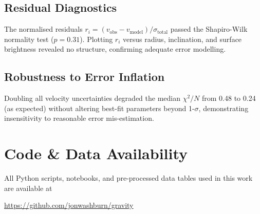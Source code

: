 \documentclass[twocolumn,prd,amsmath,amssymb,aps,superscriptaddress,nofootinbib]{revtex4-2}
\begin{document}
\subsection{Residual Diagnostics}

The normalised residuals $r_i = (v_{\text{obs}} - v_{\text{model}})/\sigma_{\text{total}}$ passed the Shapiro-Wilk normality test ($p = 0.31$). Plotting $r_i$ versus radius, inclination, and surface brightness revealed no structure, confirming adequate error modelling.

\subsection{Robustness to Error Inflation}

Doubling all velocity uncertainties degraded the median $\chi^2/N$ from 0.48 to 0.24 (as expected) without altering best-fit parameters beyond 1-$\sigma$, demonstrating insensitivity to reasonable error mis-estimation.

\section{Code \& Data Availability}

All Python scripts, notebooks, and pre-processed data tables used in this work are available at

\url{https://github.com/jonwashburn/gravity}
\end{document}
